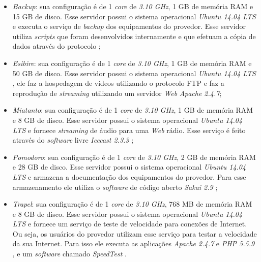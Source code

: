 \begin{itemize}
 \item \textit{Backup}: sua configuração é de 1 \textit{core} de \textit{3.10 GHz}, 1 GB de memória \ac{RAM} e 15 GB de disco. 
 Esse servidor possui o sistema operacional \textit{Ubuntu 14.04 \ac{LTS}} \cite{ubuntu} e executa o serviço de \textit{backup} dos equipamentos 
 do provedor. Esse servidor utiliza \textit{scripts} que foram desenvolvidos internamente e que efetuam a cópia de dados através do protocolo 
  \cite{kurose2006};
 
 \item \textit{Esibire}: sua configuração é de 1 \textit{core} de \textit{3.10 GHz}, 1 GB de memória \ac{RAM} e 50 GB de disco. 
 Esse servidor possui o sistema operacional \textit{Ubuntu 14.04 \ac{LTS}} \cite{ubuntu}, ele faz a hospedagem de vídeos utilizando o 
 protocolo \ac{FTP} e faz a reprodução de \textit{streaming} utilizando um servidor \textit{Web} \textit{Apache 2.4.7};
 
 \item \textit{Miatanto}: sua configuração é de 1 \textit{core} de \textit{3.10 GHz}, 1 GB de memória \ac{RAM} e 8 GB de disco. 
 Esse servidor possui o sistema operacional \textit{Ubuntu 14.04 \ac{LTS}} \cite{ubuntu} e fornece \textit{streaming} de áudio para uma \textit{Web} 
 rádio. Esse serviço é feito através do \textit{software} livre \textit{Icecast 2.3.3} \cite{icecast};
 
 \item \textit{Pomodoro}: sua configuração é de 1 \textit{core} de \textit{3.10 GHz}, 2 GB de memória \ac{RAM} e 28 GB de disco. 
 Esse servidor possui o sistema operacional \textit{Ubuntu 14.04 \ac{LTS}} \cite{ubuntu} e armazena a documentação dos equipamentos do provedor. 
 Para esse armazenamento ele utiliza o \textit{software} de código aberto \textit{Sakai 2.9} \cite{sakai};
 
 \item \textit{Trapel}: sua configuração é de 1 \textit{core} de \textit{3.10 GHz}, 768 MB de memória \ac{RAM} e 8 GB de disco. 
 Esse servidor possui o sistema operacional \textit{Ubuntu 14.04 \ac{LTS}} \cite{ubuntu} e fornece um serviço de teste de velocidade para conexões 
 de Internet. Ou seja, os usuários do provedor utilizam esse serviço para testar a velocidade da sua Internet. Para isso ele executa as aplicações 
 \textit{Apache 2.4.7} \cite{apache} e \textit{\ac{PHP} 5.5.9} \cite{php}, e um \textit{software} chamado \textit{SpeedTest} \cite{speedtest}.
\end{itemize}


